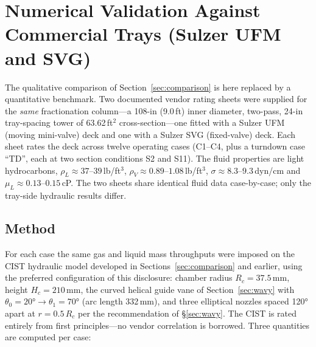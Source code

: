 \documentclass[11pt,letterpaper]{article}
\newcommand{\rhoL}{\rho_L}
\newcommand{\rhoV}{\rho_V}
\newcommand{\Rc}{R_c}
\newcommand{\Hc}{H_c}
\begin{document}
\section{Numerical Validation Against Commercial Trays (Sulzer UFM and SVG)}
\label{sec:sulzer}

The qualitative comparison of Section~\ref{sec:comparison} is here
replaced by a quantitative benchmark.  Two documented vendor rating
sheets were supplied for the \emph{same} fractionation column---a
108-in (9.0\,ft) inner diameter, two-pass, 24-in tray-spacing tower of
63.62\,ft$^2$ cross-section---one fitted with a Sulzer UFM (moving
mini-valve) deck and one with a Sulzer SVG (fixed-valve) deck.  Each
sheet rates the deck across twelve operating cases (C1--C4, plus a
turndown case ``TD'', each at two section conditions S2 and S11).  The
fluid properties are light hydrocarbons,
$\rhoL \approx 37$--$39$\,lb/ft$^3$, $\rhoV \approx 0.89$--$1.08$\,lb/ft$^3$,
$\sigma \approx 8.3$--$9.3$\,dyn/cm and $\mu_L \approx 0.13$--$0.15$\,cP.
The two sheets share identical fluid data case-by-case; only the
tray-side hydraulic results differ.

\subsection{Method}

For each case the same gas and liquid mass throughputs were imposed on
the CIST hydraulic model developed in Sections~\ref{sec:comparison}
and earlier, using the preferred configuration of this disclosure:
chamber radius $\Rc = 37.5$\,mm, height $\Hc = 210$\,mm, the curved
helical guide vane of Section~\ref{sec:wavy} with
$\theta_0 = 20°\!\to\!\theta_1 = 70°$ (arc length 332\,mm), and three
elliptical nozzles spaced 120° apart at $r = 0.5\,\Rc$ per the
recommendation of \S\ref{sec:wavy}.  The CIST is rated entirely from
first principles---no vendor correlation is borrowed.  Three quantities
are computed per case:
\end{document}
